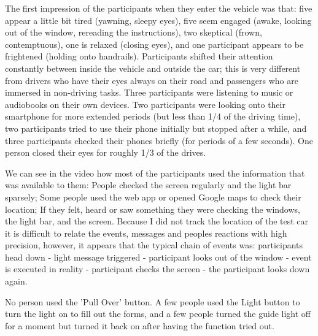 The first impression of the participants when they enter the vehicle was that: five appear a little bit tired (yawning, sleepy eyes), five seem engaged (awake, looking out of the window, rereading the instructions), two skeptical (frown, contemptuous), one is relaxed (closing eyes), and one participant appears to be frightened (holding onto handrails). Participants shifted their attention constantly between inside the vehicle and outside the car; this is very different from drivers who have their eyes always on their road and passengers who are immersed in non-driving tasks. 
Three participants were listening to music or audiobooks on their own devices. Two participants were looking onto their smartphone for more extended periods (but less than 1/4 of the driving time), two participants tried to use their phone initially but stopped after a while, and three participants checked their phones briefly (for periods of a few seconds). One person closed their eyes for roughly 1/3 of the drives. 

We can see in the video how most of the participants used the information that was available to them: People checked the screen regularly and the light bar sparsely; Some people used the web app or opened Google maps to check their location; If they felt, heard or saw something they were checking the windows, the light bar, and the screen. Because I did not track the location of the test car it is difficult to relate the events, messages and peoples reactions with high precision, however, it appears that the typical chain of events was: participants head down - light message triggered - participant looks out of the window - event is executed in reality - participant checks the screen - the participant looks down again. 

No person used the 'Pull Over' button. A few people used the Light button to turn the light on to fill out the forms, and a few people turned the guide light off for a moment but turned it back on after having the function tried out. 

